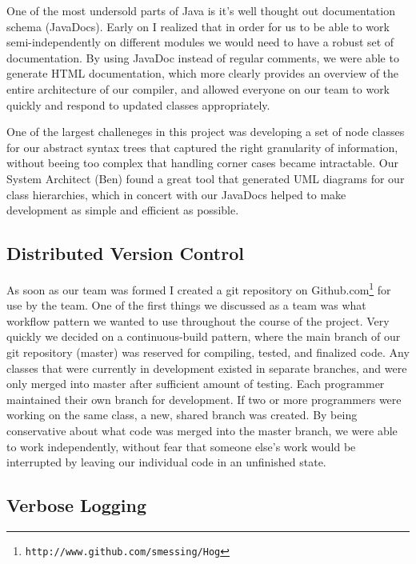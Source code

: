 \documentclass{report}
\begin{document}
One of the most undersold parts of Java is it's well thought out documentation
schema (JavaDocs). Early on I realized that in order for us to be able to work
semi-independently on different modules we would need to have a robust set of
documentation. By using JavaDoc instead of regular comments, we were able to
generate HTML documentation, which more clearly provides an overview of the entire
architecture of our compiler, and allowed everyone on our team to work quickly and
respond to updated classes appropriately.

One of the largest challeneges in this project was developing a set of node classes
for our abstract syntax trees that captured the right granularity of information,
without beeing too complex that handling corner cases became intractable. Our
System Architect (Ben) found a great tool that generated UML diagrams for our
class hierarchies, which in concert with our JavaDocs helped to make development
as simple and efficient as possible. 

\subsection{Distributed Version Control}

As soon as our team was formed I created a git repository on
Github.com\footnote{\texttt{http://www.github.com/smessing/Hog}} for use by the
team. One of the first things we discussed as a team was what workflow pattern
we wanted to use throughout the course of the project. Very quickly we decided
on a continuous-build pattern, where the main branch of our git repository 
(master) was reserved for compiling, tested, and finalized code. Any classes
that were currently in development existed in separate branches, and were only
merged into master after sufficient amount of testing. Each programmer maintained
their own branch for development. If two or more programmers were working on the
same class, a new, shared branch was created. By being conservative about what
code was merged into the master branch, we were able to work independently, without
fear that someone else's work would be interrupted by leaving our individual code
in an unfinished state. 

\subsection{Verbose Logging}
\end{document}
